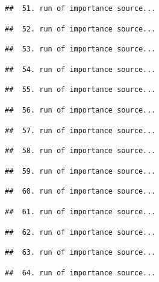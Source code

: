 \documentclass[
]{article}
\begin{document}
\begin{verbatim}
##  51. run of importance source...
\end{verbatim}

\begin{verbatim}
##  52. run of importance source...
\end{verbatim}

\begin{verbatim}
##  53. run of importance source...
\end{verbatim}

\begin{verbatim}
##  54. run of importance source...
\end{verbatim}

\begin{verbatim}
##  55. run of importance source...
\end{verbatim}

\begin{verbatim}
##  56. run of importance source...
\end{verbatim}

\begin{verbatim}
##  57. run of importance source...
\end{verbatim}

\begin{verbatim}
##  58. run of importance source...
\end{verbatim}

\begin{verbatim}
##  59. run of importance source...
\end{verbatim}

\begin{verbatim}
##  60. run of importance source...
\end{verbatim}

\begin{verbatim}
##  61. run of importance source...
\end{verbatim}

\begin{verbatim}
##  62. run of importance source...
\end{verbatim}

\begin{verbatim}
##  63. run of importance source...
\end{verbatim}

\begin{verbatim}
##  64. run of importance source...
\end{verbatim}
\end{document}
